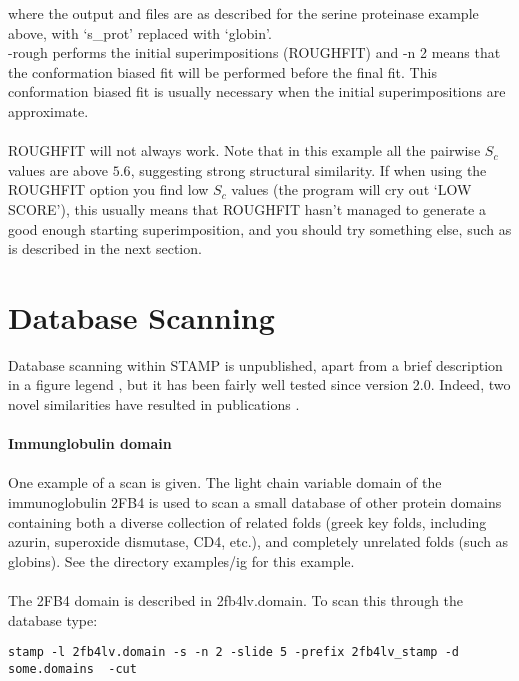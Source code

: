 where the output and files are as described for the serine proteinase example above,
with `s\_prot' replaced with `globin'.\\

-rough performs the initial superimpositions (ROUGHFIT) and -n 2 means that the conformation 
biased fit will be performed before the final fit.  This conformation biased fit is
usually necessary when the initial superimpositions are approximate.\\
\\
ROUGHFIT will not always work.  Note that in this example all the pairwise
$S_{c}$ values are above $5.6$, suggesting strong structural similarity.  If
when using the ROUGHFIT option you find low $S_{c}$ values (the program will
cry out `LOW SCORE'), this usually means that ROUGHFIT hasn't
managed to generate a good enough starting superimposition, and you should
try something else, such as is described in the next section.

\section{Database Scanning}

Database scanning within STAMP is unpublished, apart from a brief description in a figure 
legend \cite{matthews94}, but it has been fairly well tested
since version 2.0.  Indeed, two novel similarities have resulted
in publications \cite{rb93b,matthews94}.\\
\\
{\bf Immunglobulin domain}\\
\\
One example of a scan is given.  The light chain variable domain
of the immunoglobulin 2FB4 is used to scan a small database of
other protein domains containing both a diverse collection of
related folds (greek key folds, including azurin, superoxide
dismutase, CD4, etc.), and completely unrelated folds (such as
globins).  See the directory examples/ig for this example.\\
\\
The 2FB4 domain is described in 2fb4lv.domain.  To scan this 
through the database type:\\

\begin{scriptsize}\begin{verbatim}
stamp -l 2fb4lv.domain -s -n 2 -slide 5 -prefix 2fb4lv_stamp -d some.domains  -cut
\end{verbatim} \end{scriptsize}

